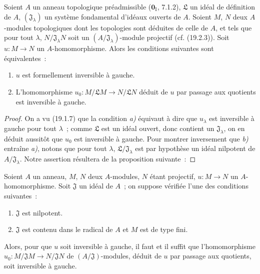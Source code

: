 \begin{proposition}[19.1.9]
\label{0.19.1.9-fr}
Soient $A$ un anneau topologique \textup{préadmissible ($\mathbf{0}_{\mathrm I}$,
7.1.2)}, $\mathfrak L$ un idéal de définition de $A$,
$(\mathfrak J_\lambda)$ un système fondamental d'idéaux ouverts de $A$.
Soient $M$, $N$ deux $A$-modules topologiques dont les topologies sont déduites
de celle de $A$, et tels que pour tout $\lambda$,
$N/\mathfrak J_\lambda N$ soit un $(A/\mathfrak J_\lambda)$-module projectif
\textup{(cf. (19.2.3))}. Soit $u:M\to N$ un $A$-homomorphisme. Alors les conditions
suivantes sont équivalentes~:
\begin{enumerate}
  \item[\textup{a)}] $u$ est formellement inversible à gauche.

  \item[\textup{b)}] L'homomorphisme
  $u_0:M/\mathfrak LM\to N/\mathfrak LN$ déduit de $u$ par passage aux
  quotients est inversible à gauche.
\end{enumerate}
\end{proposition}

\begin{proof}
On a vu (19.1.7) que la condition \emph{a)} équivaut à dire que $u_\lambda$ est
inversible à gauche pour tout $\lambda$~; comme $\mathfrak L$ est un idéal
ouvert, donc contient un $\mathfrak J_\lambda$, on en déduit aussitôt que
$u_0$ est inversible à gauche. Pour montrer inversement que \emph{b)} entraîne \emph{a)},
notons que pour tout $\lambda$, $\mathfrak L/\mathfrak J_\lambda$ est par
hypothèse un idéal nilpotent de $A/\mathfrak J_\lambda$. Notre assertion
résultera de la proposition suivante~:
\end{proof}

\begin{proposition}[19.1.10]
\label{0.19.1.10-fr}
Soient $A$ un anneau, $M$, $N$ deux $A$-modules, $N$ étant projectif,
$u:M\to N$ un $A$-homomorphisme. Soit $\mathfrak J$ un idéal de $A$~; on
suppose vérifiée \textup{l'une} des conditions suivantes~:
\begin{enumerate}
  \item[\textup{(i)}] $\mathfrak J$ est nilpotent.
  \item[\textup{(ii)}] $\mathfrak J$ est contenu dans le radical de $A$ et $M$ est de
  type fini.
\end{enumerate}

Alors, pour que $u$ soit inversible à gauche, il faut et il suffit que
l'homomorphisme
$u_0:M/\mathfrak JM\to N/\mathfrak JN$ de $(A/\mathfrak J)$-modules, déduit
de $u$ par passage aux quotients, soit inversible à gauche.
\end{proposition}


